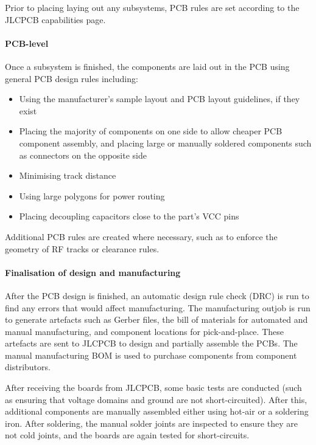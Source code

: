 \documentclass[a4paper,11pt]{article}
\begin{document}
Prior to placing laying out any subsystems, PCB rules are set according to the JLCPCB capabilities page.

\paragraph{PCB-level}


Once a subsystem is finished, the components are laid out in the PCB using general PCB design rules including:

\begin{itemize}
  \item Using the manufacturer's sample layout and PCB layout guidelines, if they exist
  \item Placing the majority of components on one side to allow cheaper PCB component assembly, and placing large or manually soldered components such as connectors on the opposite side
  \item Minimising track distance
  \item Using large polygons for power routing
  \item Placing decoupling capacitors close to the part's VCC pins
\end{itemize}


Additional PCB rules are created where necessary, such as to enforce the geometry of RF tracks or clearance rules.


\paragraph{Finalisation of design and manufacturing}

After the PCB design is finished, an automatic design rule check (DRC) is run to find any errors that would affect manufacturing. The manufacturing outjob is run to generate artefacts such as Gerber files, the bill of materials for automated and manual manufacturing, and component locations for pick-and-place. These artefacts are sent to JLCPCB to design and partially assemble the PCBs. The manual manufacturing BOM is used to purchase components from component distributors.

After receiving the boards from JLCPCB, some basic tests are conducted (such as ensuring that voltage domains and ground are not short-circuited). After this, additional components are manually assembled either using hot-air or a soldering iron. After soldering, the manual solder joints are inspected to ensure they are not cold joints, and the boards are again tested for short-circuits.
\end{document}
